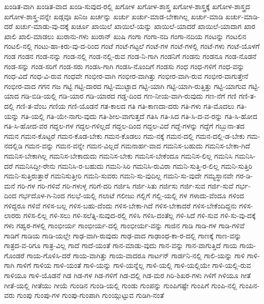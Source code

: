 {ಖಂಡಿತ-ವಾಗಿ
ಖಂಡಿತ-ವಾದ
ಖಂಡಿ-ಸುವುದ-ರಲ್ಲಿ
ಖಗೋಳ
ಖಗೋಳ-ಶಾಸ್ತ್ರ
ಖಗೋಳ-ಶಾಸ್ತ್ರಕ್ಕೆ
ಖಗೋಳ-ಶಾಸ್ತ್ರದ
ಖಗೋಳ-ಶಾಸ್ತ್ರ-ವನ್ನೇ
ಖಡ್ಗವೂ
ಖನಿಜ
ಖರ್ಚನ್ನು
ಖರ್ಚು
ಖರ್ಚು-ಮಾಡ-ಬೇಕಾಗಿಲ್ಲ
ಖರ್ಚು-ಮಾಡಿ
ಖರ್ಚು-ಮಾಡಿ-ದರೆ
ಖರ್ಚು-ಮಾಡು-ವು-ದಕ್ಕೆ
ಖರ್ಚೂ
ಖಾಯಿಲೆ
ಖಾಯಿಲೆ-ಯನ್ನು
ಖಾಯಿಲೆ-ಯಾದರೆ
ಖಾಯಿಲೆ-ಯಾದಾಗ
ಖಾರ
ಖಾಲಿ
ಖಾಲಿ-ಮಾಡಲು
ಖುರಾನು-ಗಳು
ಖುರಾನ್
ಖುಷಿ
ಗಂಗಾ
ಗಂಗಾ-ನದಿ
ಗಂಗಾ-ನದಿಯ
ಗಂಟನ್ನು
ಗಂಟಲಿನ
ಗಂಟಲಿ-ನಲ್ಲಿ
ಗಂಟು-ಹಾ-ಕಿರು-ವು-ದ-ರಿಂದ
ಗಂಟೆ
ಗಂಟೆ-ಗಟ್ಟಲೆ
ಗಂಟೆ-ಗಳ
ಗಂಟೆ-ಗಳಲ್ಲಿ
ಗಂಟೆ-ಗಳು
ಗಂಟೆ-ಯೊಳಗೆ
ಗಂಡ
ಗಂಡನ
ಗಂಡ-ನನ್ನು
ಗಂಡ-ನಲ್ಲಿ
ಗಂಡ-ನಲ್ಲಿ-ರುವ
ಗಂಡ-ನಿ-ಗಾಗಿ
ಗಂಡನಿಗೆ
ಗಂಡನು
ಗಂಡನೂ
ಗಂಡ-ನೊಡನೆ
ಗಂಡ-ಸನ್ನು
ಗಂಡ-ಸರಿಗೆ
ಗಂಡ-ಸರು
ಗಂಡಸಿ-ಗಾಗಿ
ಗಂಡಸಿ-ನೊಂದಿಗೆ
ಗಂಡಸು
ಗಂಧ
ಗಂಧ-ಗಳಿಗೆ
ಗಂಧ-ವನ್ನು
ಗಂಧ-ವಿದೆ
ಗಂಧ-ವಿ-ರುವ
ಗಂಧವೇ
ಗಂಭೀರ-ವಾಗಿ
ಗಂಭೀರ-ವಾಗಿತ್ತು
ಗಂಭೀರ-ವಾಗಿ-ರುವ
ಗಂಭೀರ-ವಾಗುತ್ತೇನೆ
ಗಂಭೀರ-ವಾದ
ಗಗನ
ಗಜ
ಗಟ್ಟಿ
ಗಟ್ಟಿ-ದಾರದ
ಗಟ್ಟಿ-ಮುಟ್ಟಾದ
ಗಟ್ಟಿ-ಯಾಗಿ
ಗಟ್ಟಿ-ಯಾಗಿ-ರುತ್ತಿತ್ತು
ಗಟ್ಟಿ-ಯಾಗುವ
ಗಟ್ಟಿ-ಯಾದ
ಗಡಿ-ಬಿಡಿ-ಯಲ್ಲಿ
ಗಡಿ-ಯಾರ
ಗಡಿ-ಯಾರದ
ಗಡ್ಡ-ದಿಂದ
ಗಣ-ನೀಯ-ವಾಗಿ-ರುವುದು
ಗಣ-ನೆಗೆ
ಗಣಿ
ಗಣಿ-ತ-ದಲ್ಲಿ
ಗಣಿ-ತ-ವೆಂಬ
ಗಣಿಯ
ಗಣಿ-ಯೊಡನೆ
ಗತ-ಕಾಲದ
ಗತಿ
ಗತಿ-ಕಾಣದಾ-ದರು
ಗತಿ-ಗಳು
ಗತಿ-ಮೊದಲು
ಗತಿ-ಯನ್ನು
ಗತಿ-ಯಲ್ಲಿ
ಗತಿ-ಯೇ-ನಾಗು-ವುದು
ಗತಿ-ಶೀಲ-ವಾಗುತ್ತದೆ
ಗತಿಸಿ
ಗತಿ-ಸಿದ
ಗತಿ-ಸಿ-ದ-ವ-ರನ್ನು
ಗತಿ-ಸಿ-ಹೋದ
ಗತಿ-ಸಿ-ಹೋದ-ವರ
ಗದ್ದಲ-ಗಳ
ಗದ್ದಲ-ಗಳಿಲ್ಲದೆ
ಗದ್ದಲ-ದಿಂದ
ಗದ್ದಲ-ವಿದೆ
ಗದ್ದೆ-ಗಳನ್ನು
ಗದ್ದೆಗೆ
ಗಬ್ಬುನಾ-ತದ
ಗಮನ
ಗಮನ-ಕೊಟ್ಟರೆ
ಗಮನ-ಕೊಡ-ಬೇಕು
ಗಮನ-ಕೊಡಲು
ಗಮ-ನಕ್ಕೆ
ಗಮನ-ದಲ್ಲಿ
ಗಮನ-ದಲ್ಲಿ-ಡ-ಬೇಕು
ಗಮ-ನದಲ್ಲಿಡಿ
ಗಮನ-ವನ್ನು
ಗಮನ-ವನ್ನೇ
ಗಮನ-ವಿಲ್ಲದೆ
ಗಮನಾರ್ಹ-ವಾದ
ಗಮನಿಸ-ಬಹುದು
ಗಮನಿಸ-ಬೇಕಾ-ಗಿದೆ
ಗಮನಿಸ-ಬೇಕಾಗಿಲ್ಲ
ಗಮನಿಸ-ಬೇಕಾದುದು
ಗಮನಿಸ-ಬೇಕು
ಗಮನಿಸ-ಬೇಕೆಂದೂ
ಗಮನಿಸ-ಲಿಲ್ಲ
ಗಮನಿಸಿ
ಗಮನಿಸಿ-ದರೆ
ಗಮನಿಸಿದ್ದೀ-ರೇನು
ಗಮನಿಸಿ-ರ-ಬಹುದು
ಗಮನಿ-ಸಿರಿ
ಗಮನಿಸಿ-ರುವಿರಾ
ಗಮನಿ-ಸುತ್ತಿ-ರ-ಲಿಲ್ಲ
ಗಮನಿ-ಸುತ್ತಿರಿ
ಗಮನಿ-ಸುತ್ತಿರುತ್ತಾರೆ
ಗಮನಿಸುತ್ತೀರಿ
ಗಮನಿ-ಸುವರು
ಗಮನಿ-ಸು-ವುದಿಲ್ಲ
ಗಮನಿ-ಸು-ವುದೇ
ಗಮ್ಯಸ್ಥಾನವೇ
ಗರ-ಡಿ-ಮನೆ
ಗರಿ-ಗಳ
ಗರಿ-ಗಳಿವೆ
ಗರಿ-ಗಳುಳ್ಳ
ಗರಿಗೆ-ದರಿ
ಗರ್ಜಿಸಿ
ಗರ್ಜಿ-ಸಿತು
ಗರ್ಜಿಸು
ಗರ್ಜಿ-ಸುವ
ಗರ್ಜಿ-ಸುವೆ
ಗರ್ಭ-ದಿಂದ
ಗರ್ಭದೊಳ-ಗಿ-ನಿಂದ
ಗಲಭೆ-ಯಲ್ಲಿ
ಗಲಾಟೆ
ಗಲೀಜು
ಗಲ್ಲಿಗೆ
ಗಲ್ಲಿ-ಯಲ್ಲಿ
ಗಳ
ಗಳಾದು-ವೆಂದೂ
ಗಳಿಂದ
ಗಳಿದ್ದರೂ
ಗಳಿವೆ
ಗಳಿಸ-ಬಲ್ಲ
ಗಳಿಸ-ಬಹು-ದೆಂದು
ಗಳಿಸ-ಬೇಕಾ-ಗಿದೆ
ಗಳಿಸ-ಬೇಕಾದರೆ
ಗಳಿಸ-ಬೇಕೆಂದಿದ್ದನು
ಗಳಿಸ-ಲಾರರು
ಗಳಿಸ-ಲಿಲ್ಲ
ಗಳಿ-ಸಲು
ಗಳಿ-ಸಲೆತ್ನಿ-ಸುವುದ-ರಲ್ಲಿ
ಗಳಿಸಿ
ಗಳಿಸಿ-ದಂತೆಲ್ಲ
ಗಳಿ-ಸಿದೆ
ಗಳಿ-ಸುವ
ಗಳಿ-ಸು-ವು-ದಕ್ಕೆ
ಗಳು
ಗಹ್ವರ-ಗಳಲ್ಲಿ
ಗಾಂಭೀರ್ಯ
ಗಾಂಭೀರ್ಯ-ದಲ್ಲಿ
ಗಾಂಭೀರ್ಯ-ವನ್ನು
ಗಾಜಿನ
ಗಾಡಿ
ಗಾಡಿ-ಗಳ
ಗಾಡಿ-ಗಳಿವೆ
ಗಾಡಿಗೆ
ಗಾಡಿಯ
ಗಾಡಿ-ಯಲ್ಲೇ
ಗಾಢ-ವಾಗಿ-ರುವುದು
ಗಾಢ-ವಾದ
ಗಾಢಾಂಧ-ಕಾ-ರ-ದಲ್ಲಿ
ಗಾಣಕ್ಕೆ
ಗಾಣ-ವನ್ನು
ಗಾತ್ರದ-ವ-ರಿಗೂ
ಗಾತ್ರ-ವಿಲ್ಲ
ಗಾದೆ
ಗಾದೆ-ಯಂತೆ
ಗಾನ-ಮಾಡು-ವುದು
ಗಾನ-ವನ್ನು
ಗಾನ-ವಾಗುತ್ತಿದೆ
ಗಾಯ
ಗಾಯ-ಗೊಂಡರೆ
ಗಾಯ-ಗೊಳಿಸಿ-ದರೆ
ಗಾಯ-ವಾಗಿತ್ತು
ಗಾಯ-ವಾದರೂ
ಗಾರ್ಟನ್
ಗಾರ್ಡನಿ-ನಲ್ಲಿ
ಗಾಲಿ-ಯನ್ನು
ಗಾಳಿ
ಗಾಳಿ-ಗಾಗಿ
ಗಾಳಿಗೆ
ಗಾಳಿಯ
ಗಾಳಿ-ಯಂತೆ
ಗಾಳಿ-ಯನ್ನು
ಗಾಳಿ-ಯನ್ನೆಲ್ಲ
ಗಾಳಿ-ಯಲ್ಲಿ
ಗಾಳಿ-ಯಲ್ಲಿಯೇ
ಗಾಳಿ-ಯಲ್ಲಿ-ರುವ
ಗಾಳಿಯೂ
ಗಾಳಿ-ಯೊಡನೆ
ಗಿಡ
ಗಿಡ-ಗಳ
ಗಿಡ-ಗಳಿಗೆ
ಗಿಡ-ದಲ್ಲಿ
ಗಿಡ-ಮರ
ಗಿರಿ-ಶಿಖರ-ಗಳು
ಗಿಳಿಗೆ
ಗಿಳಿಯೂ
ಗೀತೆ
ಗೀತೆ-ಯಲ್ಲಿ
ಗೀತೆಯು
ಗೀಯೆ
ಗುಂಡಿನ
ಗುಂಡಿ-ಯಲ್ಲಿ
ಗುಂಡು
ಗುಂಪನ್ನು
ಗುಂಪಿಗಷ್ಟೇ
ಗುಂಪಿಗೆ
ಗುಂಪಿ-ನಲ್ಲಿ
ಗುಂಪಿನ-ವರು
ಗುಂಪು
ಗುಂಪು-ಗಳ
ಗುಂಪು-ಗುಂಪಾಗಿ
ಗುಂಯ್ಗುಟ್ಟುವ
ಗುಡಿಗಿ-ನಂತೆ
}
